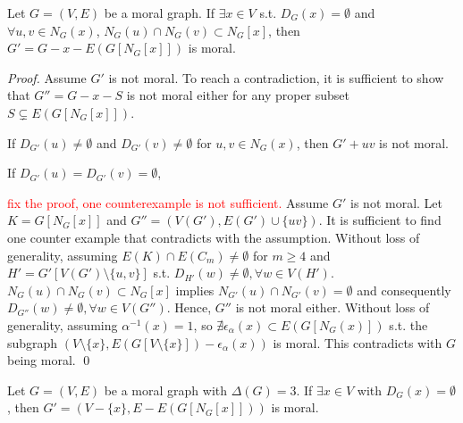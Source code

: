 \begin{lemma}
\label{lm:1kp}
Let $G=(V,E)$ be a moral graph. If $\exists x \in V$ s.t. $D_G(x)=\emptyset$ and $\forall u, v \in N_G(x)$, $N_G(u)\cap N_G(v) \subset N_G[x]$, then $G'=G-x-E(G[N_G[x]])$ is moral.
\end{lemma}
\begin{proof}
Assume $G'$ is not moral. To reach a contradiction, it is sufficient to show that $G''=G-x-S$ is not moral either for any proper subset $S \subsetneq E(G[N_G[x]])$. 

If $D_{G'}(u) \neq \emptyset$ and $D_{G'}(v) \neq \emptyset$ for $u,v \in N_G(x)$, then $G'+uv$ is not moral.

If $D_{G'}(u) = D_{G'}(v)= \emptyset$,

\textcolor{red}{fix the proof, one counterexample is not sufficient.}
Assume $G'$ is not moral. Let $K=G[N_G[x]]$ and $G''=(V(G'),E(G')\cup \{uv\})$. It is sufficient to find one counter example that contradicts with the assumption. Without loss of generality, assuming $E(K)\cap E(C_m) \neq \emptyset$ for $m \ge 4$ and $H'=G'[V(G')\setminus \{u,v\}]$ s.t. $D_{H'}(w) \neq \emptyset, \forall w \in V(H')$. $N_G(u) \cap N_G(v) \subset N_G[x]$ implies $N_{G'}(u) \cap N_{G'}(v)=\emptyset$ and consequently $D_{G''}(w) \neq \emptyset, \forall w \in V(G'')$. Hence, $G''$ is not moral either. Without loss of generality, assuming $\alpha^{-1}(x)=1$, so $\nexists \epsilon_{\alpha}(x) \subset E(G[N_G(x)])$ s.t. the subgraph $(V\setminus \{x\}, E(G[V\setminus \{x\}]) - \epsilon_{\alpha}(x))$ is moral. This contradicts with $G$ being moral. \qed
\end{proof}
\begin{lemma}
\label{lm:wrs_deg3}
Let $G=(V,E)$ be a moral graph with $\Delta(G)=3$. If $\exists x \in V$ with $D_G(x)=\emptyset$, then $G'=(V-\{x\}, E-E(G[N_G[x]]))$ is moral. 
\end{lemma}
